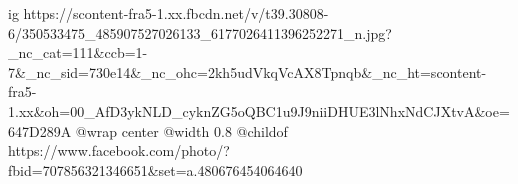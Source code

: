  
 
 
 
 

\ifcmt
  ig https://scontent-fra5-1.xx.fbcdn.net/v/t39.30808-6/350533475_485907527026133_6177026411396252271_n.jpg?_nc_cat=111&ccb=1-7&_nc_sid=730e14&_nc_ohc=2kh5udVkqVcAX8Tpnqb&_nc_ht=scontent-fra5-1.xx&oh=00_AfD3ykNLD_cyknZG5oQBC1u9J9niiDHUE3lNhxNdCJXtvA&oe=647D289A
  @wrap center
  @width 0.8
  @childof https://www.facebook.com/photo/?fbid=707856321346651&set=a.480676454064640
\fi
